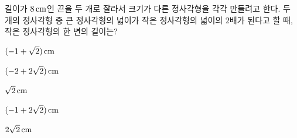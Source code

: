 길이가 $8\mkern3mu \mathrm{cm}$인 끈을 두 개로 잘라서 크기가 다른 정사각형을 각각 만들려고 한다. 두 개의 정사각형 중 큰 정사각형의 넓이가 작은 정사각형의 넓이의 $2$배가 된다고 할 때, 작은 정사각형의 한 변의 길이는?
\begin{choicesii}{\rule[-3ex]{0pt}{8ex}$(-1+\sqrt{2})\mkern3mu \mathrm{cm}$}{\rule[-3ex]{0pt}{8ex}$(-2+2\sqrt{2})\mkern3mu \mathrm{cm}$}{\rule[-3ex]{0pt}{8ex}$\sqrt{2}\mkern3mu \mathrm{cm}$}{\rule[-3ex]{0pt}{8ex}$(-1+2\sqrt{2})\mkern3mu \mathrm{cm}$}{\rule[-3ex]{0pt}{8ex}$2\sqrt{2}\mkern3mu \mathrm{cm}$}\end{choicesii}
